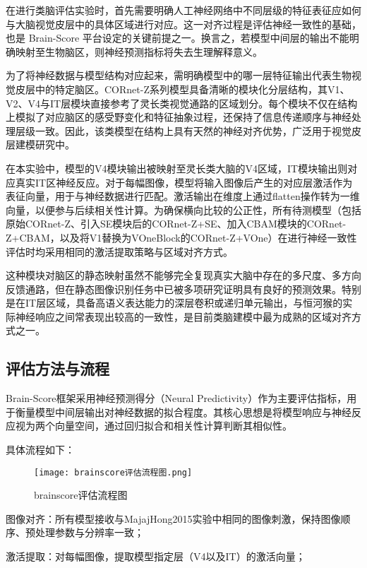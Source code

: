 在进行类脑评估实验时，首先需要明确人工神经网络中不同层级的特征表征应如何与大脑视觉皮层中的具体区域进行对应。这一对齐过程是评估神经一致性的基础，也是 Brain-Score 平台设定的关键前提之一。换言之，若模型中间层的输出不能明确映射至生物脑区，则神经预测指标将失去生理解释意义\cite{schrimpf2018brain}。

为了将神经数据与模型结构对应起来，需明确模型中的哪一层特征输出代表生物视觉皮层中的特定脑区。CORnet-Z系列模型具备清晰的模块化分层结构，其V1、V2、V4与IT层模块直接参考了灵长类视觉通路的区域划分。每个模块不仅在结构上模拟了对应脑区的感受野变化和特征抽象过程，还保持了信息传递顺序与神经处理层级一致。因此，该类模型在结构上具有天然的神经对齐优势，广泛用于视觉皮层建模研究中\cite{kubilius2019brain}。

在本实验中，模型的V4模块输出被映射至灵长类大脑的V4区域，IT模块输出则对应真实IT区神经反应。对于每幅图像，模型将输入图像后产生的对应层激活作为表征向量，用于与神经数据进行匹配。激活输出在维度上通过flatten操作转为一维向量，以便参与后续相关性计算。为确保横向比较的公正性，所有待测模型（包括原始CORnet-Z、引入SE模块后的CORnet-Z+SE、加入CBAM模块的CORnet-Z+CBAM，以及将V1替换为VOneBlock的CORnet-Z+VOne）在进行神经一致性评估时均采用相同的激活提取策略与区域对齐方式。

这种模块对脑区的静态映射虽然不能够完全复现真实大脑中存在的多尺度、多方向反馈通路，但在静态图像识别任务中已被多项研究证明具有良好的预测效果。特别是在IT层区域，具备高语义表达能力的深层卷积或递归单元输出，与恒河猴的实际神经响应之间常表现出较高的一致性，是目前类脑建模中最为成熟的区域对齐方式之一\cite{rajalingham2018large}。


\subsection{评估方法与流程}

Brain-Score框架采用神经预测得分（Neural Predictivity）作为主要评估指标，用于衡量模型中间层输出对神经数据的拟合程度。其核心思想是将模型响应与神经反应视为两个向量空间，通过回归拟合和相关性计算判断其相似性。

具体流程如下：

\begin{figure}[hbt]
	\centering
	\texttt{[image: brainscore评估流程图.png]}
	\caption{brainscore评估流程图}
	\label{f.brainscore评估流程图}
\end{figure}

图像对齐：所有模型接收与MajajHong2015实验中相同的图像刺激，保持图像顺序、预处理参数与分辨率一致；

激活提取：对每幅图像，提取模型指定层（V4以及IT）的激活向量；


